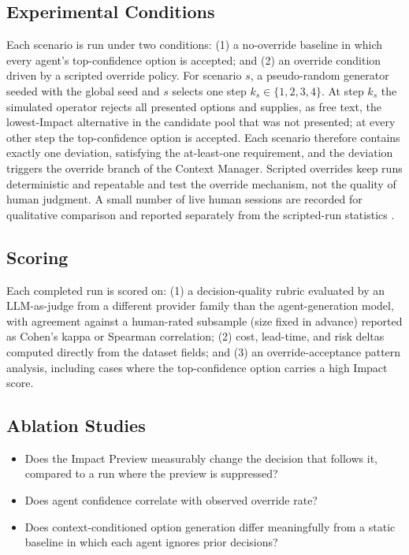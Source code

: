 \documentclass[conference]{IEEEtran}
\begin{document}
\subsection{Experimental Conditions}
Each scenario is run under two conditions: (1) a no-override baseline in which every agent's top-confidence option is accepted; and (2) an override condition driven by a scripted override policy. For scenario $s$, a pseudo-random generator seeded with the global seed and $s$ selects one step $k_s \in \{1,2,3,4\}$. At step $k_s$ the simulated operator rejects all presented options and supplies, as free text, the lowest-Impact alternative in the candidate pool that was not presented; at every other step the top-confidence option is accepted. Each scenario therefore contains exactly one deviation, satisfying the at-least-one requirement, and the deviation triggers the override branch of the Context Manager. Scripted overrides keep runs deterministic and repeatable and test the override mechanism, not the quality of human judgment. A small number of live human sessions are recorded for qualitative comparison and reported separately from the scripted-run statistics \cite{governance2026}.

\subsection{Scoring}
Each completed run is scored on: (1) a decision-quality rubric evaluated by an LLM-as-judge from a different provider family than the agent-generation model, with agreement against a human-rated subsample (size fixed in advance) reported as Cohen's kappa or Spearman correlation; (2) cost, lead-time, and risk deltas computed directly from the dataset fields; and (3) an override-acceptance pattern analysis, including cases where the top-confidence option carries a high Impact score.

\subsection{Ablation Studies}
\begin{itemize}
\item Does the Impact Preview measurably change the decision that follows it, compared to a run where the preview is suppressed?
\item Does agent confidence correlate with observed override rate?
\item Does context-conditioned option generation differ meaningfully from a static baseline in which each agent ignores prior decisions?
\end{itemize}
\end{document}
